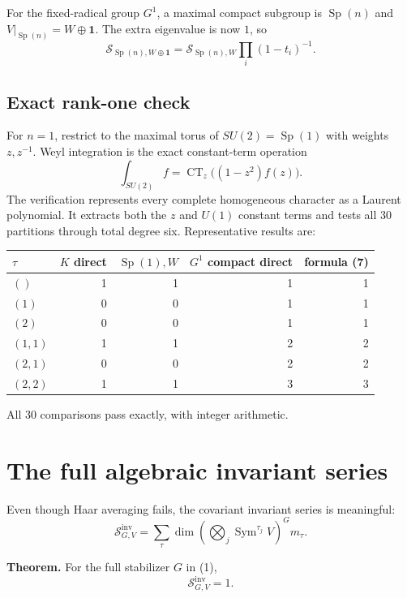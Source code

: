 \documentclass[11pt]{article}
\newcommand{\Sfun}{\mathcal S}
\newcommand{\Sym}{\operatorname{Sym}}
\newcommand{\Sp}{\operatorname{Sp}}
\begin{document}
For the fixed-radical group $G^1$, a maximal compact subgroup is $\Sp(n)$ and
$V|_{\Sp(n)}=W\oplus\mathbf 1$. The extra eigenvalue is now $1$, so
\begin{equation}
 \boxed{\Sfun_{\Sp(n),W\oplus\mathbf1}
 =\Sfun_{\Sp(n),W}\prod_i(1-t_i)^{-1}.}
\end{equation}

\subsection*{Exact rank-one check}

For $n=1$, restrict to the maximal torus of $SU(2)=\Sp(1)$ with weights
$z,z^{-1}$. Weyl integration is the exact constant-term operation
\[
 \int_{SU(2)}f=\operatorname{CT}_z\bigl((1-z^2)f(z)\bigr).
\]
The verification represents every complete homogeneous character as a Laurent
polynomial. It extracts both the $z$ and $U(1)$ constant terms and tests all 30
partitions through total degree six. Representative results are:
\begin{center}
\begin{tabular}{@{}lrrrr@{}}
\toprule
$\tau$ & $K$ direct & $\Sp(1),W$ & $G^1$ compact direct & formula (7)\\
\midrule
$()$      &1&1&1&1\\
$(1)$     &0&0&1&1\\
$(2)$     &0&0&1&1\\
$(1,1)$   &1&1&2&2\\
$(2,1)$   &0&0&2&2\\
$(2,2)$   &1&1&3&3\\
\bottomrule
\end{tabular}
\end{center}
All 30 comparisons pass exactly, with integer arithmetic.

\section{The full algebraic invariant series}

Even though Haar averaging fails, the covariant invariant series is meaningful:
\begin{equation}
 \Sfun^{\mathrm{inv}}_{G,V}
 =\sum_\tau\dim\left(\bigotimes_j\Sym^{\tau_j}V\right)^Gm_\tau.
\end{equation}

\textbf{Theorem.} For the full stabilizer $G$ in (1),
\begin{equation}
 \boxed{\Sfun^{\mathrm{inv}}_{G,V}=1.}
\end{equation}
\end{document}
